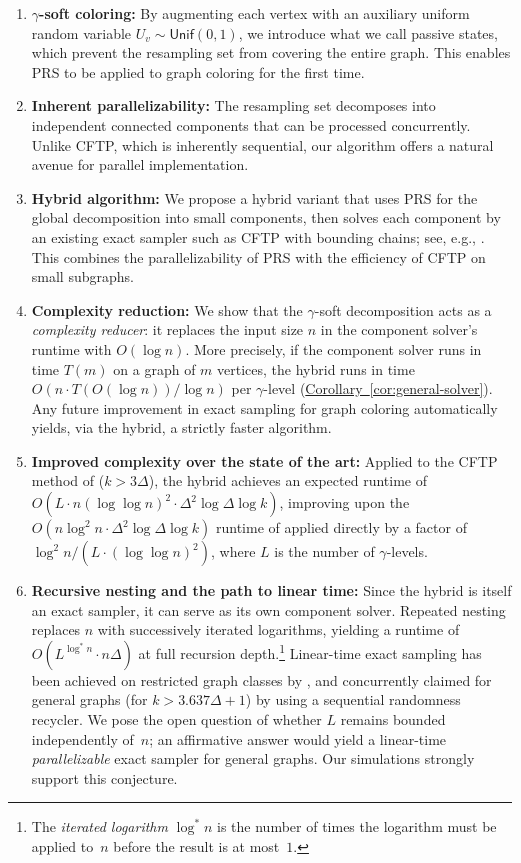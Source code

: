 \documentclass[12pt, a4paper]{article}
\theoremstyle{plain}
\theoremstyle{definition}
\theoremstyle{remark}
\newcommand{\lt}{\left}
\newcommand{\rt}{\right}
\newcommand{\sref}[2]{\hyperref[#2]{#1~\ref*{#2}}}
\newcommand{\unif}{\mathsf{Unif}}
\begin{document}
\begin{enumerate}
    \item {\bf \(\gamma\)-soft coloring:} By augmenting each vertex with an auxiliary uniform random variable \(U_v\sim\unif(0,1)\), we introduce what we call passive states, which prevent the resampling set from covering the entire graph. This enables PRS to be applied to graph coloring for the first time.
    \item {\bf Inherent parallelizability:} The resampling set decomposes into independent connected components that can be processed concurrently. Unlike CFTP, which is inherently sequential, our algorithm offers a natural avenue for parallel implementation.
    \item {\bf Hybrid algorithm:} We propose a hybrid variant that uses PRS for the global decomposition into small components, then solves each component by an existing exact sampler such as CFTP with bounding chains; see, e.g., \cite{MH96, BC20}. This combines the parallelizability of PRS with the efficiency of CFTP on small subgraphs.
    \item {\bf Complexity reduction:} We show that the \(\gamma\)-soft decomposition acts as a {\em complexity reducer}: it replaces the input size \(n\) in the component solver's runtime with \(O(\log n)\). More precisely, if the component solver runs in time \(T(m)\) on a graph of \(m\) vertices, the hybrid runs in time \(O(n\cdot T(O(\log n))/\log n)\) per \(\gamma\)-level (\sref{Corollary}{cor:general-solver}). Any future improvement in exact sampling for graph coloring automatically yields, via the hybrid, a strictly faster algorithm.
    \item {\bf Improved complexity over the state of the art:} Applied to the CFTP method of \cite{BC20} (\(k>3\Delta\)), the hybrid achieves an expected runtime of \(O\!\lt(L\cdot n(\log\log n)^2\cdot\Delta^2\log\Delta\log k\rt)\), improving upon the \(O(n\log^2 n\cdot\Delta^2\log\Delta\log k)\) runtime of \cite{BC20} applied directly by a factor of \(\log^2 n / (L\cdot(\log\log n)^2)\), where \(L\) is the number of \(\gamma\)-levels.
    \item {\bf Recursive nesting and the path to linear time:} Since the hybrid is itself an exact sampler, it can serve as its own component solver. Repeated nesting replaces \(n\) with successively iterated logarithms, yielding a runtime of \(O(L^{\log^* n}\cdot n\Delta)\) at full recursion depth.\footnote{The {\em iterated logarithm} \(\log^* n\) is the number of times the logarithm must be applied to~\(n\) before the result is at most~\(1\).} Linear-time exact sampling has been achieved on restricted graph classes by \cite{FGY22}, and concurrently claimed for general graphs (for \(k > 3.637\Delta+1\)) by \cite{BH25} using a sequential randomness recycler. We pose the open question of whether \(L\) remains bounded independently of~\(n\); an affirmative answer would yield a linear-time {\em parallelizable} exact sampler for general graphs. Our simulations strongly support this conjecture.

\end{enumerate}
\end{document}
